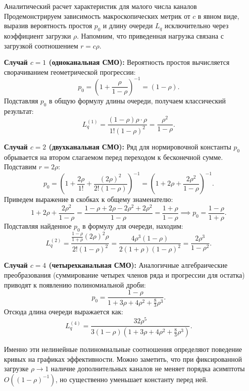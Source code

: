 \begin{example}{Аналитический расчет характеристик для малого числа каналов}
Продемонстрируем зависимость макроскопических метрик от $c$ в явном виде, выразив вероятность простоя $p_0$ и длину очереди $L_q$ исключительно через коэффициент загрузки $\rho$. Напомним, что приведенная нагрузка связана с загрузкой соотношением $r = c\rho$.

\textbf{Случай $c=1$ (одноканальная СМО):}
Вероятность простоя вычисляется сворачиванием геометрической прогрессии:
$$
p_0 = \left( 1 + \frac{\rho}{1-\rho} \right)^{-1} = (1 - \rho).
$$
Подставляя $p_0$ в общую формулу длины очереди, получаем классический результат:
$$
L_q^{(1)} = \frac{(1-\rho) \rho \cdot \rho}{1! (1-\rho)^2} = \frac{\rho^2}{1-\rho}.
$$

\textbf{Случай $c=2$ (двухканальная СМО):}
Ряд для нормировочной константы $p_0$ обрывается на втором слагаемом перед переходом к бесконечной сумме. Подставим $r = 2\rho$:
$$
p_0 = \left( 1 + \frac{2\rho}{1!} + \frac{(2\rho)^2}{2!(1-\rho)} \right)^{-1} = \left( 1 + 2\rho + \frac{2\rho^2}{1-\rho} \right)^{-1}.
$$
Приведем выражение в скобках к общему знаменателю:
$$
1 + 2\rho + \frac{2\rho^2}{1-\rho} = \frac{1 - \rho + 2\rho - 2\rho^2 + 2\rho^2}{1-\rho} = \frac{1 + \rho}{1-\rho} \implies p_0 = \frac{1-\rho}{1+\rho}.
$$
Подставляя найденное $p_0$ в формулу для очереди, находим:
$$
L_q^{(2)} = \frac{\frac{1-\rho}{1+\rho} (2\rho)^2 \rho}{2! (1-\rho)^2} = \frac{4\rho^3 (1-\rho)}{2(1+\rho)(1-\rho)^2} = \frac{2\rho^3}{1-\rho^2}.
$$

\textbf{Случай $c=4$ (четырехканальная СМО):}
Аналогичные алгебраические преобразования (суммирование четырех членов ряда и прогрессии для остатка) приводят к появлению полиномиальной дроби:
$$
p_0 = \frac{1-\rho}{1 + 3\rho + 4\rho^2 + \frac{8}{3}\rho^3}.
$$
Отсюда длина очереди выражается как:
$$
L_q^{(4)} = \frac{32 \rho^5}{3 (1-\rho) \left( 1 + 3\rho + 4\rho^2 + \frac{8}{3}\rho^3 \right)}.
$$

Именно эти нелинейные полиномиальные соотношения определяют поведение кривых на графиках эффективности. Можно заметить, что при фиксированной загрузке $\rho \to 1$ наличие дополнительных каналов не меняет порядка асимптоты $O((1-\rho)^{-1})$, но существенно уменьшает константу перед ней.
\end{example}

